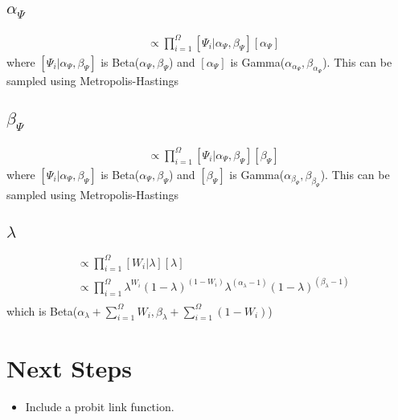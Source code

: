 \documentclass[fleqn]{article}
\begin{document}
\subsection{$\alpha_\Psi$}
%
\begin{align*}
  [\alpha_\Psi | \cdot] & \propto \prod_{i = 1}^\Omega [\Psi_i | \alpha_\Psi, \beta_\Psi] [\alpha_\Psi] 
\end{align*}
where $[\Psi_i | \alpha_\Psi, \beta_\Psi]$ is Beta($\alpha_\Psi, \beta_\Psi$) and $[\alpha_\Psi]$ is Gamma($\alpha_{\alpha_\Psi}, \beta_{\alpha_\Psi}$). This can be sampled using Metropolis-Hastings
%
%
%
\subsection{$\beta_\Psi$}
%
\begin{align*}
  [\beta_\Psi | \cdot] & \propto \prod_{i = 1}^\Omega [\Psi_i | \alpha_\Psi, \beta_\Psi] [\beta_\Psi] 
\end{align*}
where $[\Psi_i | \alpha_\Psi, \beta_\Psi]$ is Beta($\alpha_\Psi, \beta_\Psi$) and $[\beta_\Psi]$ is Gamma($\alpha_{\beta_\Psi}, \beta_{\beta_\Psi}$). This can be sampled using Metropolis-Hastings
%
\subsection{$\lambda$}
%
\begin{align*}
  [\lambda | \cdot ] & \propto \prod_{i = 1}^\Omega [W_i | \lambda] [\lambda]\\
  & \propto  \prod_{i = 1}^\Omega \lambda^{W_i} (1 - \lambda)^{(1 - W_i)} \lambda^{(\alpha_\lambda - 1)} (1 - \lambda)^{(\beta_\lambda - 1)}\\
\end{align*}
%
which is Beta($\alpha_\lambda + \sum_{i = 1}^\Omega W_i, \beta_\lambda + \sum_{i = 1}^\Omega (1 - W_i)$)
%
\section{Next Steps}
\begin{itemize}
  \item Include a probit link function.
\end{itemize}
\end{document}
